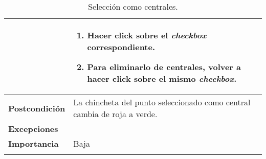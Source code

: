 \begin{longtable}[H]{@{}l|l@{}}
\begin{minipage}[t]{0.23\columnwidth}
	\end{minipage} & \begin{minipage}[t]{0.71\columnwidth}\raggedright
		\begin{enumerate}
			\def\labelenumi{\arabic{enumi}.}
			\tightlist
			\item Hacer click sobre el \textit{checkbox} correspondiente.
			\item Para eliminarlo de centrales, volver a hacer click sobre el mismo \textit{checkbox}.
		\end{enumerate}
	\end{minipage}\tabularnewline
	\midrule
	\begin{minipage}[t]{0.23\columnwidth}\raggedright\strut
		\textbf{Postcondición}\strut
	\end{minipage} & \begin{minipage}[t]{0.71\columnwidth}\raggedright\strut
		La chincheta del punto seleccionado como central cambia de roja a verde.\strut
	\end{minipage}\tabularnewline
	\midrule
	\begin{minipage}[t]{0.23\columnwidth}\raggedright\strut
		\textbf{Excepciones}\strut
	\end{minipage} & \begin{minipage}[t]{0.71\columnwidth}\raggedright
		
	\end{minipage}\tabularnewline
	\midrule
	\begin{minipage}[t]{0.23\columnwidth}\raggedright\strut
		\textbf{Importancia}\strut
	\end{minipage} & \begin{minipage}[t]{0.71\columnwidth}\raggedright\strut
		Baja\strut
	\end{minipage}\tabularnewline
	\bottomrule
	\caption{Selección como centrales.}
	\label{cu:2.2.1}
\end{longtable}
\newpage

